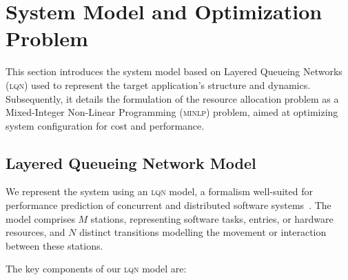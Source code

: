 \documentclass{article}
\newcommand{\minlp}{\textsc{minlp}}
\newcommand{\lqn}{\textsc{lqn}}
\begin{document}

\section{System Model and Optimization Problem}
\label{sec:model_opt}

This section introduces the system model based on Layered Queueing Networks (\lqn{}) used to represent the target application's structure and dynamics. Subsequently, it details the formulation of the resource allocation problem as a Mixed-Integer Non-Linear Programming (\minlp{}) problem, aimed at optimizing system configuration for cost and performance.

\subsection{Layered Queueing Network Model}
\label{subsec:lqn_model}

We represent the system using an \lqn{} model, a formalism well-suited for performance prediction of concurrent and distributed software systems~\cite{franks2009layered}. The model comprises \(M\) stations, representing software tasks, entries, or hardware resources, and \(N\) distinct transitions modelling the movement or interaction between these stations.

The key components of our \lqn{} model are:
\end{document}
